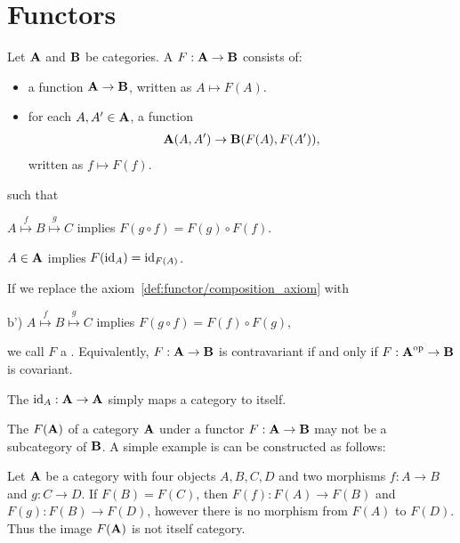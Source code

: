 \section{Functors}\label{sec:functors}

\begin{definition}\label{def:functor}\cite[definitions 1.2.1, 1.2.10]{Leinster2014}
  Let \( \operatorname{\mathbf{A}} \) and \( \operatorname{\mathbf{B}} \) be categories. A  \( F: \operatorname{\mathbf{A}} \to \operatorname{\mathbf{B}} \) consists of:
  \begin{itemize}
    \item a function \( \operatorname{\mathbf{A}} \to \operatorname{\mathbf{B}} \), written as \( A \mapsto F(A) \).
    \item for each \( A, A' \in \operatorname{\mathbf{A}} \), a function
    \begin{align*}
      \operatorname{\mathbf{A}}(A, A') \to \operatorname{\mathbf{B}}(F(A), F(A')),
    \end{align*}
    written as \( f \mapsto F(f) \).
  \end{itemize}
  such that
  \begin{defenum}
    \item\label{def:functor/composition_axiom} \( A \overset f \mapsto B \overset g \mapsto C \) implies \( F(g \circ f) = F(g) \circ F(f) \).
    \item\label{def:functor/identity_axiom} \( A \in \operatorname{\mathbf{A}} \) implies \( F(\operatorname{id}_A) = \operatorname{id}_{F(A)} \).
  \end{defenum}

  If we replace the axiom~\cref{def:functor/composition_axiom} with
  \begin{defenum}
    \item[b')]\label{def:functor/contravariant_composition_axiom} \( A \overset f \mapsto B \overset g \mapsto C \) implies \( F(g \circ f) = F(f) \circ F(g) \),
  \end{defenum}
  we call \( F \) a . Equivalently, \( F: \operatorname{\mathbf{A}} \to \operatorname{\mathbf{B}} \) is contravariant if and only if \( F: \operatorname{\mathbf{A}}^{\operatorname{op}} \to \operatorname{\mathbf{B}} \) is covariant.

  The  \( \operatorname{id}_A: \operatorname{\mathbf{A}} \to \operatorname{\mathbf{A}} \) simply maps a category to itself.
\end{definition}

\begin{note}\label{note:image_of_functor_maybe_not_subcategory}
  The  \( F(\operatorname{\mathbf{A}}) \) of a category \( \operatorname{\mathbf{A}} \) under a functor \( F: \operatorname{\mathbf{A}} \to \operatorname{\mathbf{B}} \) may not be a subcategory of \( \operatorname{\mathbf{B}} \). A simple example is can be constructed as follows:

  Let \( \operatorname{\mathbf{A}} \) be a category with four objects \( A, B, C, D \) and two morphisms \( f: A \to B \) and \( g: C \to D \). If \( F(B) = F(C) \), then \( F(f): F(A) \to F(B) \) and \( F(g): F(B) \to F(D) \), however there is no morphism from \( F(A) \) to \( F(D) \). Thus the image \( F(\operatorname{\mathbf{A}}) \) is not itself category.
\end{note}

